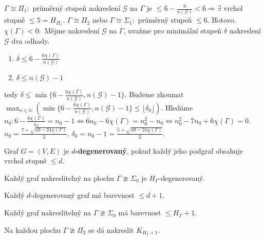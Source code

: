 \begin{dukaz}
	$\Gamma \cong \Pi_{1}:$ průměrný stupeň nakreslení $\mathcal{G}$ na $\Gamma$ je $\leq 6 - \frac{6}{n(\mathcal{G})} < 6 \Rightarrow \exists$ vrchol stupně $\leq 5 = H_{\Pi_{1}}$. $\Gamma \cong \Pi_{2}$ nebo $\Gamma \cong \Sigma_{1}:$ průměrný stupeň $\leq 6$. Hotovo. $\chi(\Gamma) < 0:$ Mějme nakreslení $\mathcal{G}$ na $\Gamma$, uvažme pro minimální stupeň $\delta$ nakreslení $\mathcal{G}$ dva odhady.
	
	\begin{enumerate}
		\item $\delta \leq 6 - \frac{6 \chi(\Gamma)}{n(\mathcal{G})}$
		\item $\delta \leq n(\mathcal{G}) -1$
	\end{enumerate}
	
	tedy $\delta \leq \min \{6 - \frac{6 \chi(\Gamma)}{n(\mathcal{G})}, n(\mathcal{G}) -1\}$. Budeme zkoumat $\max_{n \in \mathbb{N}}(\min \{6 - \frac{6 \chi(\Gamma)}{n(\mathcal{G})}, n(\mathcal{G}) -1\} \leq \lfloor \delta_{0} \rfloor)$. Hledáme $n_{0}: 6 - \frac{6 \chi(\Gamma)}{n_{0}} = n_{0} -1 \Leftrightarrow 6n_{0} - 6\chi(\Gamma) = n_{0}^{2} - n_{0} \Leftrightarrow n_{0}^{2} - 7n_{0} + 6\chi(\Gamma) = 0$. $n_{0} = \frac{7+\sqrt{49-24\chi(\Gamma)}}{2}$. $\delta_{0} = n_{0} - 1 = \frac{5+\sqrt{49-24\chi(\Gamma)}}{2}$.
\end{dukaz}

\begin{definice}
	Graf $G=(V,E)$ je \textbf{$d$-degenerovaný}, pokud každý jeho podgraf obsahuje vrchol stupně $\leq d$.
\end{definice}

\begin{dusl}
	Každý graf nakreslitelný na plochu $\Gamma \ncong \Sigma_{0}$ je $H_{\Gamma}$-degenerovaný.
\end{dusl}

\begin{pozor}
	Každý $d$-degenerovaný graf má barevnost $\leq d+1$.
\end{pozor}

\begin{dusl}[Heawood]
	Každý graf nakreslitelný na $\Gamma \ncong \Sigma_{0}$ má barevnost $\leq H_{\Gamma} + 1$.
\end{dusl}

\begin{fakt}
	Na každou plochu $\Gamma \ncong \Pi_{2}$ se dá nakreslit $K_{H_{\Gamma}+1}$.
\end{fakt}
